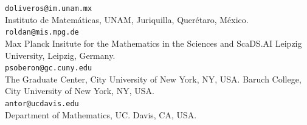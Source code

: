\documentclass[11pt,a4paper]{article}
\theoremstyle{plain}
\theoremstyle{definition}
\begin{document}


\noindent \texttt{doliveros@im.unam.mx}\\
Instituto de Matem\'aticas, UNAM, Juriquilla, Quer\'etaro, M\'exico.\\[0.1cm]

\noindent \texttt{roldan@mis.mpg.de}\\
Max Planck Insitute for the Mathematics in the Sciences and ScaDS.AI Leipzig University, Leipzig, Germany.\\[0.1cm]

\noindent \texttt{psoberon@gc.cuny.edu}\\
The Graduate Center, City University of New York, NY, USA.
Baruch College, City University of New York, NY, USA.\\[0.1cm]

\noindent \texttt{antor@ucdavis.edu}\\
Department of Mathematics, UC. Davis, CA, USA.\\
\end{document}
